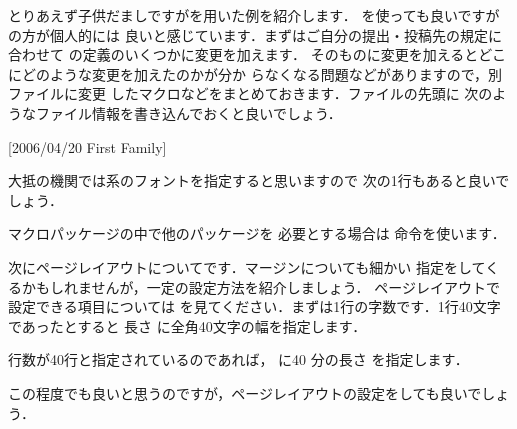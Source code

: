 とりあえず子供だましですがを用いた例を紹介します．
を使っても良いですがの方が個人的には
良いと感じています．まずはご自分の提出・投稿先の規定に合わせて
の定義のいくつかに変更を加えます．
そのものに変更を加えるとどこにどのような変更を加えたのかが分か
らなくなる問題などがありますので，別ファイルに変更
したマクロなどをまとめておきます．ファイルの先頭に
次のようなファイル情報を書き込んでおくと良いでしょう．

\begin{InTeX}
[2006/04/20 First Family]
\end{InTeX}


大抵の機関では系のフォントを指定すると思いますので
次の1行もあると良いでしょう．

\begin{InTeX}
\RequirePackage{txfonts}
\end{InTeX}

マクロパッケージの中で他のパッケージを
必要とする場合は  命令を使います．

次にページレイアウトについてです．マージンについても細かい
指定をしてくるかもしれませんが，一定の設定方法を紹介しましょう．
ページレイアウトで設定できる項目については
を見てください．まずは1行の字数です．1行40文字であったとすると
長さ に全角40文字の幅を指定します．

\begin{InTeX}
\setlength\textwidth{40zw}
\setlength\fullwidth{\textwidth}%
\end{InTeX}

行数が40行と指定されているのであれば， に40
分の長さ  を指定します．

\begin{InTeX}
\setlength{}
\end{InTeX}

この程度でも良いと思うのですが，ページレイアウトの設定をしても良いでしょう．

%
%
%
%
%
%
%
%
%
%
\begin{InTeX}
\setlength{}
\setlength{}
\setlength{}
\setlength\oddsidemargin{\evensidemargin}
\setlength{}
\setlength{}
\setlength{}
\setlength{}
\setlength{}
\setlength{}
\end{InTeX}

